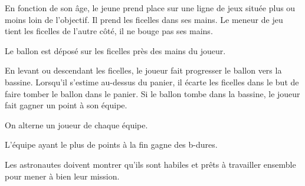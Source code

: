 \documentclass{grand-jeu}
\begin{document}
\begin{liste-materiel}
\end{liste-materiel}

\begin{regles}
En fonction de son âge, le jeune prend place sur une ligne de jeux située plus ou moins loin de l'objectif. Il prend les ficelles dans ses mains. Le meneur de jeu tient les ficelles de l'autre côté, il ne bouge pas ses mains.

Le ballon est déposé sur les ficelles près des mains du joueur.

En levant ou descendant les ficelles, le joueur fait progresser le ballon vers la bassine. Lorsqu'il s'estime au-dessus du panier, il écarte les ficelles dans le but de faire tomber le ballon dans le panier. Si le ballon tombe dans la bassine, le joueur fait gagner un point à son équipe.

On alterne un joueur de chaque équipe.

L'équipe ayant le plus de points à  la fin gagne des b-dures.
\end{regles}

\begin{imaginaire}
Les astronautes doivent montrer qu'ils sont habiles et prêts à travailler ensemble pour mener à bien leur mission.  
\end{imaginaire}

\begin{moments-stop}
\end{moments-stop}
\end{document}
